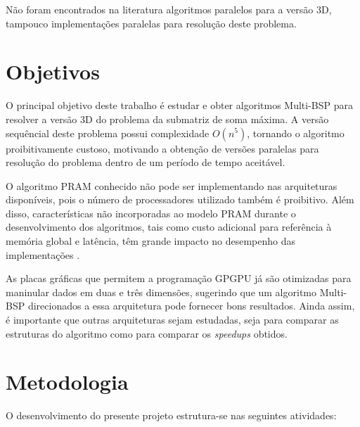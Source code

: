 \documentclass[a4paper, 12pt] {article}
\begin{document}
Não foram encontrados na literatura algoritmos paralelos para a versão
3D, tampouco implementações paralelas para resolução deste problema.


\section{Objetivos}

O principal objetivo deste trabalho é estudar e obter algoritmos Multi-BSP
para resolver a versão 3D do problema da submatriz de soma máxima. A versão sequêncial deste
problema possui complexidade $O(n^5)$, tornando o algoritmo proibitivamente
custoso, motivando a obtenção de versões paralelas para resolução do problema
dentro de um período de tempo aceitável.

O algoritmo PRAM conhecido não pode ser implementando nas arquiteturas
disponíveis, pois o número de processadores utilizado também é proibitivo. Além
disso, características não incorporadas ao modelo PRAM durante o
desenvolvimento dos algoritmos, tais como custo adicional para referência à memória global e latência, 
têm grande impacto no desempenho das implementações \cite{castro2003}.

As placas gráficas que permitem a programação GPGPU já são otimizadas para
maninular dados em duas e três dimensões, sugerindo que um algoritmo Multi-BSP
direcionados a essa arquitetura pode fornecer bons resultados. Ainda assim, é
importante que outras arquiteturas sejam estudadas, seja para comparar as
estruturas do algoritmo como para comparar os \textit{speedups} obtidos.

\section{Metodologia}

O desenvolvimento do presente projeto estrutura-se nas seguintes atividades:
\end{document}
